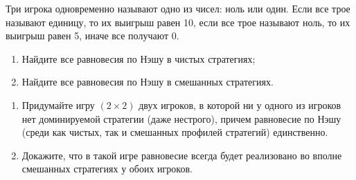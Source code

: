 \begin{problem}
Три игрока одновременно называют одно из чисел: ноль или один. Если все трое называют единицу, то их выигрыш равен 10, если все трое называют ноль, то их выигрыш равен 5, иначе все получают 0.\par
\begin{enumerate}
\item 	Найдите все равновесия по Нэшу в чистых стратегиях;\par
\item 	Найдите все равновесия по Нэшу в смешанных стратегиях.
\end{enumerate}


\begin{sol}

\end{sol}
\end{problem}



\begin{problem}
\begin{source}
\cite{polisci:lectures}
\end{source}
 \begin{enumerate} \item Придумайте игру  $\left(2\times 2\right)$  двух игроков, в которой ни у одного из игроков нет доминируемой стратегии (даже нестрого), причем равновесие по Нэшу (среди как чистых, так и смешанных профилей стратегий)  единственно.\par
\item 	Докажите, что в такой игре равновесие всегда будет реализовано во вполне смешанных стратегиях у обоих игроков.
\end{enumerate}


\begin{sol}

\end{sol}
\end{problem}



